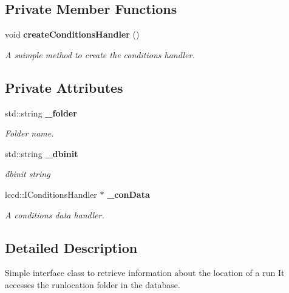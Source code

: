 \subsection*{Private Member Functions}
\begin{DoxyCompactItemize}
\item 
void {\bf create\-Conditions\-Handler} ()\label{classCALICE_1_1RunLocationWhizard_ab4eb27f5fb121858ead5d27be5bf45f3}

\begin{DoxyCompactList}\small\item\em A suimple method to create the conditions handler. \end{DoxyCompactList}\end{DoxyCompactItemize}
\subsection*{Private Attributes}
\begin{DoxyCompactItemize}
\item 
std\-::string {\bf \-\_\-folder}\label{classCALICE_1_1RunLocationWhizard_a1c7eeff9f0411c3a885ecee2d7bfbfc8}

\begin{DoxyCompactList}\small\item\em Folder name. \end{DoxyCompactList}\item 
std\-::string {\bf \-\_\-dbinit}\label{classCALICE_1_1RunLocationWhizard_a61b7efac157c2370d83ee627efbc3563}

\begin{DoxyCompactList}\small\item\em dbinit string \end{DoxyCompactList}\item 
lccd\-::\-I\-Conditions\-Handler $\ast$ {\bf \-\_\-con\-Data}\label{classCALICE_1_1RunLocationWhizard_a06e4848ddb058006abe9343dc9c4127c}

\begin{DoxyCompactList}\small\item\em A conditions data handler. \end{DoxyCompactList}\end{DoxyCompactItemize}


\subsection{Detailed Description}
Simple interface class to retrieve information about the location of a run It accesses the runlocation folder in the database. 

